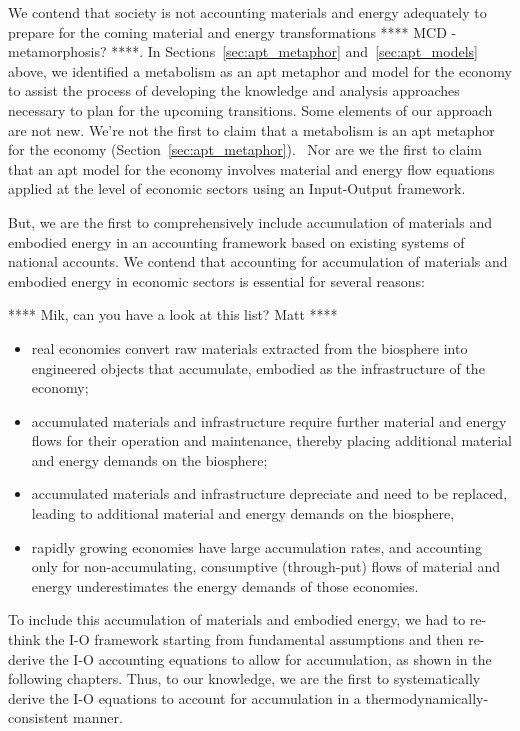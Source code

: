 We contend that society is not accounting materials and energy adequately 
to prepare for the coming material and energy transformations 
**** MCD - metamorphosis? ****.
In Sections~\ref{sec:apt_metaphor} and~\ref{sec:apt_models} above,
we identified a metabolism as an apt metaphor and model for the economy 
to assist the process of developing the knowledge and analysis approaches
necessary to plan for the upcoming transitions.
Some elements of our approach are not new.
We're not the first to claim that a metabolism is an apt metaphor for the economy
(Section~\ref{sec:apt_metaphor}).~\cite{Barradas1936, F-K1998, Giampietro2000, Haberl2001, Daniels2001}
Nor are we the first to claim that an apt model for the economy 
involves material and energy flow equations 
applied at the level of economic sectors using an Input-Output framework.~\cite{G-R1975 ,G-R1979a, Lenzen1998, Hendrickson2006}

But, we are the first to comprehensively include accumulation
of materials and embodied energy in an accounting framework
based on existing systems of national accounts.
We contend that accounting for accumulation 
of materials and embodied energy in economic sectors is essential
for several reasons:

**** Mik, can you have a look at this list? Matt ****

\begin{itemize}
	\item{real economies convert raw materials extracted from the biosphere
		 	into engineered objects that accumulate,  
			embodied as the infrastructure of the economy;}
	\item{accumulated materials and infrastructure require further material and energy flows
			for their operation and maintenance,
			thereby placing additional material and energy demands on the biosphere;}
	\item{accumulated materials and infrastructure depreciate and need to be replaced,
		 	leading to additional material and energy demands on the biosphere,}
	\item{rapidly growing economies have large accumulation rates, 
			and accounting only for non-accumulating,
			consumptive (through-put) flows of material and energy 
			underestimates the energy demands of those economies.}
\end{itemize}

To include this accumulation of materials and embodied energy, 
we had to re-think the I-O framework starting from fundamental assumptions
and then re-derive the I-O accounting equations
to allow for accumulation, as shown in the following chapters. 
Thus, to our knowledge, we are the first 
to systematically derive the I-O equations to account for accumulation
in a thermodynamically-consistent manner.

